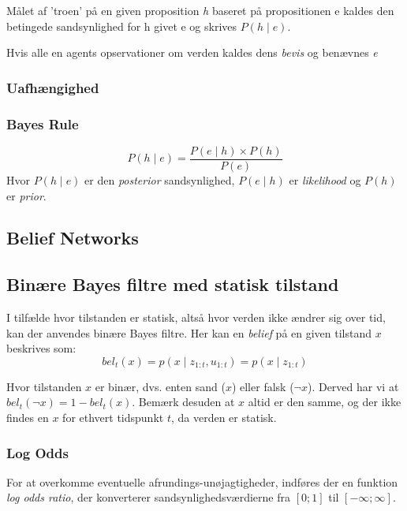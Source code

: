 Målet af 'troen' på en given proposition \emph{h} baseret på propositionen e kaldes
den betingede sandsynlighed for h givet e og skrives $P(h \mid e)$.

Hvis alle en agents opservationer om verden kaldes dens \emph{bevis} og benævnes \emph{e}




\subsubsection{Uafhængighed}



\subsubsection{Bayes Rule}

$$P(h \mid e) = \frac{P(e \mid h) \times P(h)}{P(e)}$$
Hvor $P(h \mid e)$ er den \emph{posterior} sandsynlighed, $P(e \mid h)$ er \emph{likelihood} og $P(h)$ er \emph{prior}. 


\subsection{Belief Networks}







\subsection{Binære Bayes filtre med statisk tilstand}
I tilfælde hvor tilstanden er statisk, altså hvor verden ikke ændrer sig over tid, kan der anvendes binære Bayes filtre.
Her kan en \textit{belief} på en given tilstand $x$ beskrives som:
\begin{equation}
bel_t(x) = p(x \mid z_{1:t},u_{1:t}) = p(x \mid z_{1:t})
\end{equation}

Hvor tilstanden $x$ er binær, dvs. enten sand ($x$) eller falsk ($\lnot x$).
Derved har vi at $bel_t(\lnot x) = 1 - bel_t(x)$.
Bemærk desuden at $x$ altid er den samme, og der ikke findes en $x$ for ethvert tidspunkt $t$, da verden er statisk.

\subsubsection{Log Odds}
For at overkomme eventuelle afrundings-unøjagtigheder, indføres der en funktion \textit{log odds ratio}, der konverterer sandsynlighedsværdierne fra $[0;1]$ til $[-\infty;\infty]$.

